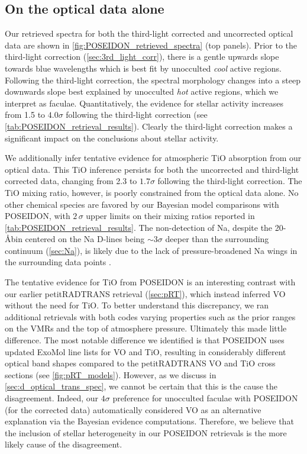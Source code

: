 \documentclass[twocolumn]{aastex63}
\begin{document}
\subsection{On the optical data alone}

Our retrieved spectra for both the third-light corrected and uncorrected optical data are shown in \autoref{fig:POSEIDON_retrieved_spectra} (top panels). Prior to the third-light correction (\autoref{sec:3rd_light_corr}), there is a gentle upwards slope towards blue wavelengths which is best fit by unocculted \textit{cool} active regions. Following the third-light correction, the spectral morphology changes into a steep downwards slope best explained by unocculted \textit{hot} active regions, which we interpret as faculae. Quantitatively, the evidence for stellar activity increases from 1.5 to $4.0\sigma$ following the third-light correction (see \autoref{tab:POSEIDON_retrieval_results}). Clearly the third-light correction makes a significant impact on the conclusions about stellar activity. 

We additionally infer tentative evidence for atmospheric TiO absorption from our optical data. This TiO inference persists for both the uncorrected and third-light corrected data, changing from 2.3 to $1.7\sigma$ following the third-light correction. The TiO mixing ratio, however, is poorly constrained from the optical data alone. No other chemical species are favored by our Bayesian model comparisons with POSEIDON, with $2\,\sigma$ upper limits on their mixing ratios reported in \autoref{tab:POSEIDON_retrieval_results}. The non-detection of Na, despite the 20-\AA bin centered on the Na D-lines being ${\sim}3\sigma$ deeper than the surrounding continuum (\autoref{sec:Na}), is likely due to the lack of pressure-broadened Na wings in the surrounding data points \citep[e.g.,][]{Nikolov2018,Alam2021}.

The tentative evidence for TiO from POSEIDON is an interesting contrast with our earlier petitRADTRANS retrieval (\autoref{sec:pRT}), which instead inferred VO without the need for TiO. To better understand this discrepancy, we ran additional retrievals with both codes varying properties such as the prior ranges on the VMRs and the top of atmosphere pressure. Ultimately this made little difference. The most notable difference we identified is that POSEIDON uses updated ExoMol line lists for VO and TiO, resulting in considerably different optical band shapes compared to the petitRADTRANS VO and TiO cross sections (see \autoref{fig:pRT_models}). However, as we discuss in \autoref{sec:d_optical_trans_spec}, we cannot be certain that this is the cause the disagreement. Indeed, our $4\sigma$ preference for unocculted faculae with POSEIDON (for the corrected data) automatically considered VO as an alternative explanation via the Bayesian evidence computations. Therefore, we believe that the inclusion of stellar heterogeneity in our POSEIDON retrievals is the more likely cause of the disagreement.
\end{document}
